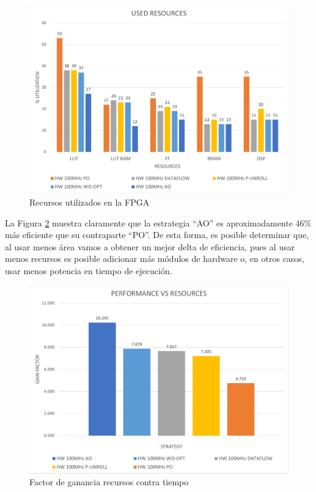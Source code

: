 \begin{figure}[!ht]
	\centering
		\includegraphics[scale=0.6]{Figures/usedResources}
	\caption{Recursos utilizados en la FPGA}
	\label{fig:usedResources}
\end{figure}

La Figura \ref{fig:performanceResources} muestra claramente que la estrategia ``AO'' es aproximadamente 46\% más eficiente que su contraparte ``PO''. De esta forma, es posible determinar que, al usar menos área vamos a obtener un mejor delta de eficiencia, pues al usar menos recursos es posible adicionar más módulos de hardware o, en otros casos, usar menos potencia en tiempo de ejecución.

\begin{figure}[!ht]
	\centering
		\includegraphics[scale=0.6]{Figures/performanceResources}
	\caption{Factor de ganancia recursos contra tiempo}
	\label{fig:performanceResources}
\end{figure}

